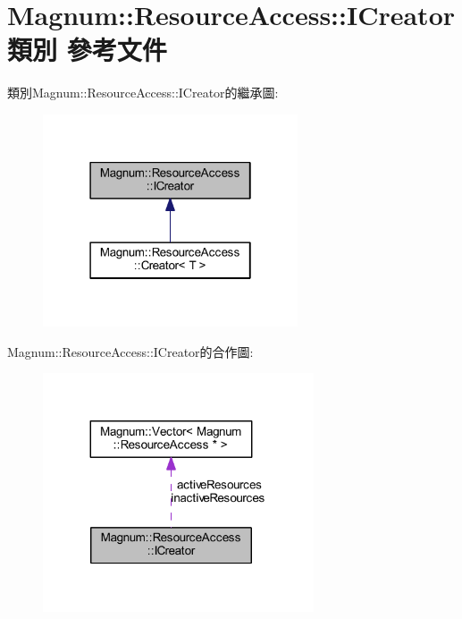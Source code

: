 \hypertarget{class_magnum_1_1_resource_access_1_1_i_creator}{}\section{Magnum\+:\+:Resource\+Access\+:\+:I\+Creator 類別 參考文件}
\label{class_magnum_1_1_resource_access_1_1_i_creator}


類別\+Magnum\+:\+:Resource\+Access\+:\+:I\+Creator的繼承圖\+:\nopagebreak
\begin{figure}[H]
\begin{center}
\leavevmode
\includegraphics[width=214pt]{class_magnum_1_1_resource_access_1_1_i_creator__inherit__graph}
\end{center}
\end{figure}


Magnum\+:\+:Resource\+Access\+:\+:I\+Creator的合作圖\+:\nopagebreak
\begin{figure}[H]
\begin{center}
\leavevmode
\includegraphics[width=227pt]{class_magnum_1_1_resource_access_1_1_i_creator__coll__graph}
\end{center}
\end{figure}
